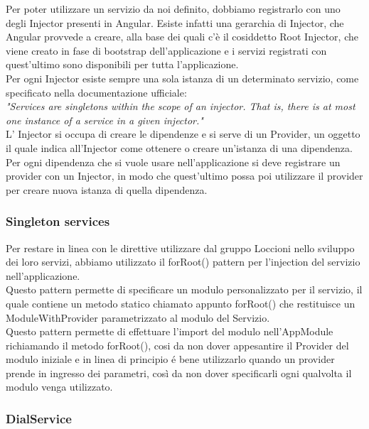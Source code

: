 Per poter utilizzare un servizio da noi definito, dobbiamo registrarlo con uno degli Injector presenti in Angular. Esiste infatti una gerarchia di Injector, che Angular provvede a creare, alla base dei quali c'è il cosiddetto Root Injector, che viene creato in fase di bootstrap dell’applicazione e i servizi registrati con quest’ultimo sono disponibili per tutta l’applicazione.\\

Per ogni Injector esiste sempre una sola istanza di un determinato servizio, come specificato nella documentazione ufficiale:\\

\emph{"Services are singletons within the scope of an injector. That is, there is at most one instance of a service in a given injector."}\\

L’ Injector si occupa di creare le dipendenze e si serve di un Provider, un oggetto il quale indica all'Injector come ottenere o creare un'istanza di una dipendenza.
Per ogni dipendenza che si vuole usare nell'applicazione si deve registrare un provider con un Injector, in modo che quest'ultimo possa poi utilizzare il provider per creare nuova istanza di quella dipendenza.

\subsubsection{Singleton services}

Per restare in linea con le direttive utilizzare dal gruppo Loccioni nello sviluppo dei loro servizi, abbiamo utilizzato il forRoot() pattern \cite{ss} per l’injection del servizio nell’applicazione.\\

Questo pattern permette di specificare un modulo personalizzato per il servizio, il quale contiene un metodo statico chiamato appunto forRoot() che restituisce un ModuleWithProvider parametrizzato al modulo del Servizio.\\

Questo pattern permette di effettuare l’import del modulo nell’AppModule richiamando il metodo forRoot(), cosi da non dover appesantire il Provider del modulo iniziale e in linea di principio é bene utilizzarlo quando un provider prende in ingresso dei parametri, così da non dover specificarli ogni qualvolta il modulo venga utilizzato.

\subsubsection{DialService}

